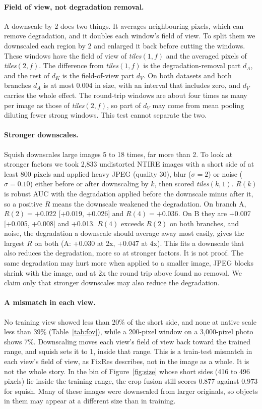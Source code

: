 \documentclass[letterpaper]{article} %
\begin{document}
\paragraph{Field of view, not degradation removal.} A downscale by 2 does
two things. It averages neighbouring pixels, which can remove degradation,
and it doubles each window's field of view. To split them we downscaled each
region by 2 and enlarged it back before cutting the windows. These windows
have the field of view of \emph{tiles}$(1, f)$ and the averaged pixels of
\emph{tiles}$(2, f)$. The difference from \emph{tiles}$(1, f)$ is the
degradation-removal part $d_A$, and the rest of $d_K$ is the field-of-view
part $d_V$. On both datasets and both branches $d_A$ is at most 0.004 in size,
with an interval that includes zero, and $d_V$ carries the whole effect. The
round-trip windows are about four times as many per image as those of
\emph{tiles}$(2, f)$, so part of $d_V$ may come from mean pooling diluting
fewer strong windows. This test cannot separate the two.

\paragraph{Stronger downscales.} Squish downscales large images 5 to 18
times, far more than 2. To look at stronger factors we took 2,833 undistorted
NTIRE images with a short side of at least 800 pixels and applied heavy JPEG
(quality 30), blur ($\sigma = 2$) or noise ($\sigma = 0.10$) either before or
after downscaling by $k$, then scored \emph{tiles}$(k, 1)$. $R(k)$ is robust
AUC with the degradation applied before the downscale minus after it, so a
positive $R$ means the downscale weakened the degradation. On branch A,
$R(2) = +0.022$ [+0.019, +0.026] and $R(4) = +0.036$. On B they are +0.007
[+0.005, +0.008] and +0.013. $R(4)$ exceeds $R(2)$ on both branches, and noise,
the degradation a downscale should average away most easily, gives the largest
$R$ on both (A: +0.030 at 2x, +0.047 at 4x). This fits a downscale that also
reduces the degradation, more so at stronger factors. It is not proof. The
same degradation may hurt more when applied to a smaller image, JPEG blocks
shrink with the image, and at 2x the round trip above found no removal. We
claim only that stronger downscales may also reduce the degradation.

\paragraph{A mismatch in each view.} No training view showed less than
20\% of the short side, and none at native scale less than 39\%
(Table~\ref{tab:fov}), while a 200-pixel window on a 3,000-pixel photo shows
7\%. Downscaling moves each view's field of view back toward the trained
range, and squish sets it to 1, inside that range. This is a train-test
mismatch in each view's field of view, as FixRes describes, not in the image
as a whole. It is not the whole story. In the bin of Figure~\ref{fig:size}
whose short sides (416 to 496 pixels) lie inside the training range, the crop
fusion still scores 0.877 against 0.973 for squish. Many of these images were
downscaled from larger originals, so objects in them may appear at a
different size than in training.
\end{document}
